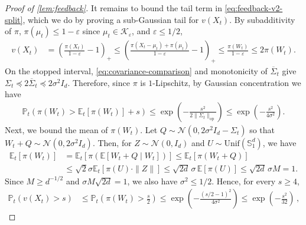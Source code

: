\documentclass[11pt]{article}
\newcommand{\E}{\mathbb E}
\newcommand{\Pp}{\mathbb P}
\newcommand{\K}{\mathcal K}
\newcommand{\op}{\mathrm{op}}
\newcommand{\1}{\mathbf 1}
\newcommand{\eps}{\varepsilon}
\begin{document}
\begin{proof}[Proof of \cref{lem:feedback}]
    It remains to bound the tail term in
    \eqref{eq:feedback-v2-split},
    which we do by proving a sub-Gaussian tail for $v(X_t)$.
    By subadditivity of $\pi$, $\pi(\mu_t)\leq1-\eps$ since $\mu_t\in\K_\eps$, and $\eps\leq1/2$,
    \begin{align}
        v(X_t)
         & =
        \left(
        \frac{\pi(X_t)}{1-\eps}-1
        \right)_+
        \leq
        \left(
        \frac{\pi(X_t - \mu_t) + \pi(\mu_t)}{1-\eps}-1
        \right)_+
        \leq
        \frac{\pi(W_t)}{1-\eps}
        \leq
        2\pi(W_t).
        \label{eq:feedback-v-minkowski}
    \end{align}
    On the stopped interval,
    \eqref{eq:covariance-comparison} and monotonicity of
    $\overline\Sigma_t$ give
    $\Sigma_t
        \preceq
        2\overline\Sigma_t
        \preceq
        2\sigma^2I_d$.
    Therefore, since $\pi$ is $1$-Lipschitz, by Gaussian concentration we have
    \begin{align}
        \Pp_t\left(
        \pi(W_t)>
        \E_t[\pi(W_t)]+s
        \right)
        \leq
        \exp\left(-\frac{s^2}{2\|\Sigma_t\|_{\op}}\right)
        \leq
        \exp\left(-\frac{s^2}{4\sigma^2}\right).
        \label{eq:feedback-minkowski-tail}
    \end{align}
    Next, we bound the mean of $\pi(W_t)$.
    Let $Q \sim \mathcal{N}(0, 2\sigma^2 I_d - \Sigma_t)$
    so that $W_t + Q \sim \mathcal{N}(0, 2\sigma^2 I_d)$.
    Then, for $Z \sim \mathcal{N}(0, I_d)$ and $U\sim \text{Unif}(\mathbb{S}_1^d)$, we have
    \begin{align}
        \E_t[\pi(W_t)]
         & =
        \E_t[\pi(\E[W_t+Q\mid W_t])]
        \leq
        \E_t[\pi(W_t + Q)] \\
         & \leq
        \sqrt{2}\sigma
        \E_t[\pi(U)\cdot \|Z\|]
        \leq
        \sqrt{2d}\,\sigma\,\E[\pi(U)]
        \leq
        \sqrt{2d}\,\sigma M
        =1.
        \label{eq:feedback-minkowski-mean}
    \end{align}
    Since $M\geq d^{-1/2}$ and $\sigma M\sqrt{2d}=1$, we also have $\sigma^2\leq1/2$.
    Hence, for every $s\geq4$,
    \begin{align}
        \Pp_t\left(
        v(X_t)>s
        \right)
         & \leq
        \Pp_t\left(
        \pi(W_t)>\frac{s}{2}
        \right)
        \leq
        \exp\left(
        -\frac{(s/2-1)^2}{4\sigma^2}
        \right)
        \leq
        \exp\left(-\frac{s^2}{32}\right)\,,
        \label{eq:feedback-v-tail}
    \end{align}

\end{proof}
\end{document}
